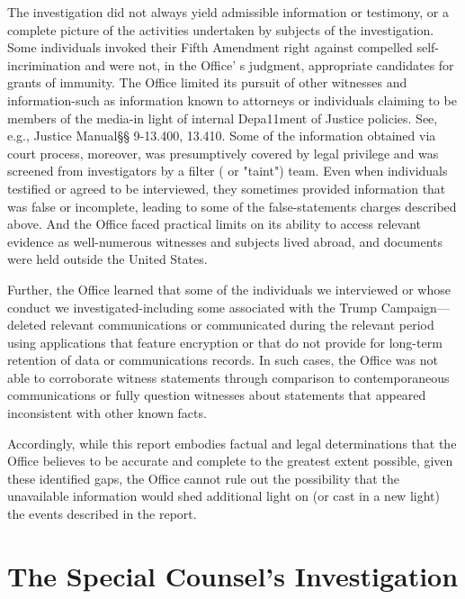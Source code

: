 \documentclass{article}
\begin{document}
The investigation did not always yield admissible information or testimony, or a complete picture of the activities undertaken by subjects of the investigation. Some individuals invoked their Fifth Amendment right against compelled self-incrimination and were not, in the Office' s judgment, appropriate candidates for grants of immunity. The Office limited its pursuit of other witnesses and information-such as information known to attorneys or individuals claiming to be members of the media-in light of internal Depa11ment of Justice policies. See, e.g., Justice Manual§§ 9-13.400, 13.410. Some of the information obtained via court process, moreover, was presumptively covered by legal privilege and was screened from investigators by a  filter ( or "taint") team. Even when individuals testified or agreed to be interviewed, they sometimes provided information that was false or incomplete, leading to some of the false-statements charges described above. And the Office faced practical limits on its ability to access relevant evidence as well-numerous witnesses and subjects lived abroad, and documents were held outside the United States.

Further, the Office learned that some of the individuals we interviewed or whose conduct we investigated-including some associated with the Trump Campaign---deleted relevant communications or communicated during the relevant period using applications that feature encryption or that do not provide for long-term retention of data or communications records. In such cases,  the Office was not able to corroborate witness statements through comparison to contemporaneous communications or fully question witnesses about statements that appeared inconsistent with other known facts.

Accordingly, while this report embodies factual and legal determinations that the Office believes to be accurate and complete to the greatest extent possible, given these identified gaps, the Office cannot rule out the possibility that the unavailable information would shed additional light on (or cast in a new light) the events described in the report.

\section{The Special Counsel's Investigation}
\end{document}
